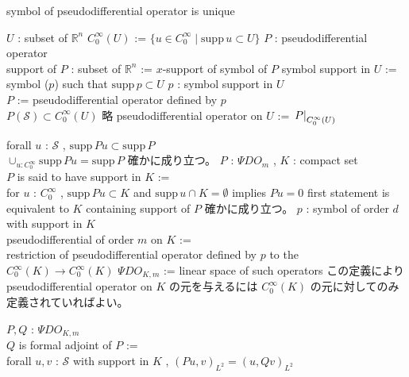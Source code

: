 \begin{Theorem}
\itemprop
  \Then symbol of pseudodifferential operator is unique
\end{Theorem}

\begin{Definition}
\itemwhen
  \Fix \(U\) : subset of \(\mathbb{R}^n\)
\itemdefi
  \Define \(C^\infty_0(U)\) := \(\{u \in C^\infty_0 \mid \text{supp} \, u \subset U\}\)
\itemdefi
  \For \(P\) : pseudodifferential operator \\
  \Define support of \(P\) : subset of \(\mathbb{R}^n\) := \(x\)-support of symbol of \(P\)
\itemdefi
  \Define symbol support in \(U\) := symbol (\(p\)) such that \(\text{supp} \, p \subset U\)
\itemprop
  \For \(p\) : symbol support in \(U\) \\
  \Let \(P\) := pseudodifferential operator defined by \(p\) \\
  \Then \(P(\mathscr{S}) \subset C^\infty_0(U)\)
\itemprof
  略
\itemprop
  \Define pseudodifferential operator on \(U\) := \(\left. {P} \right| _{C^\infty_0(U)}\)
\end{Definition}

\begin{Definition}

\itemprop
  \Then forall \(u\) : \(\mathscr{S}\) , \(\text{supp} \, Pu \subset \text{supp} \, P\) \\
  \Then \(\cup_{u : C^\infty_0} \text{supp} \, Pu = \text{supp} \, P\)
\itemprof
  確かに成り立つ。
\itemdefi
  \For \(P\) : \(\Psi DO_m\) , \(K\) : compact set \\
  \Define \(P\) is said to have support in \(K\) := \\
  for \(u\) : \(C^\infty_0\) , \(\text{supp} \, Pu \subset K\) and \(\text{supp} \, u \cap K = \emptyset\) implies \(P u = 0\)
\itemprop
  \Then first statement is equivalent to \(K\) containing support of \(P\)
\itemprof
  確かに成り立つ。
\itemdefi
  \For \(p\) : symbol of order \(d\) with support in \(K\) \\
  \Define pseudodifferential of order \(m\) on \(K\) := \\
  restriction of pseudodifferential operator defined by \(p\) to the \(C^\infty_0(K) \to C^\infty_0(K)\)
\itemdefi
  \Define \(\Psi DO_{K,m}\) := linear space of such operators
\itemnote
  この定義により pseudodifferential operator on \(K\) の元を与えるには \(C^\infty_0(K)\) の元に対してのみ定義されていればよい。
\end{Definition}

\begin{Definition}
\itemdefi
  \For \(P , Q\) : \(\Psi DO_{K,m}\) \\
  \Define \(Q\) is formal adjoint of \(P\) := \\
  forall \(u,v\) : \(\mathscr{S}\) with support in \(K\) , \((Pu , v)_{L^2} = (u , Q v)_{L^2}\)
\end{Definition}

